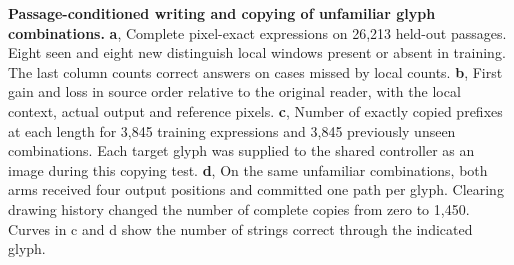 \textbf{Passage-conditioned writing and copying of unfamiliar glyph combinations.}
\textbf{a}, Complete pixel-exact expressions on 26,213 held-out passages. Eight seen and eight new distinguish local windows present or absent in training. The last column counts correct answers on cases missed by local counts.
\textbf{b}, First gain and loss in source order relative to the original reader, with the local context, actual output and reference pixels.
\textbf{c}, Number of exactly copied prefixes at each length for 3,845 training expressions and 3,845 previously unseen combinations. Each target glyph was supplied to the shared controller as an image during this copying test.
\textbf{d}, On the same unfamiliar combinations, both arms received four output positions and committed one path per glyph. Clearing drawing history changed the number of complete copies from zero to 1,450. Curves in c and d show the number of strings correct through the indicated glyph.
